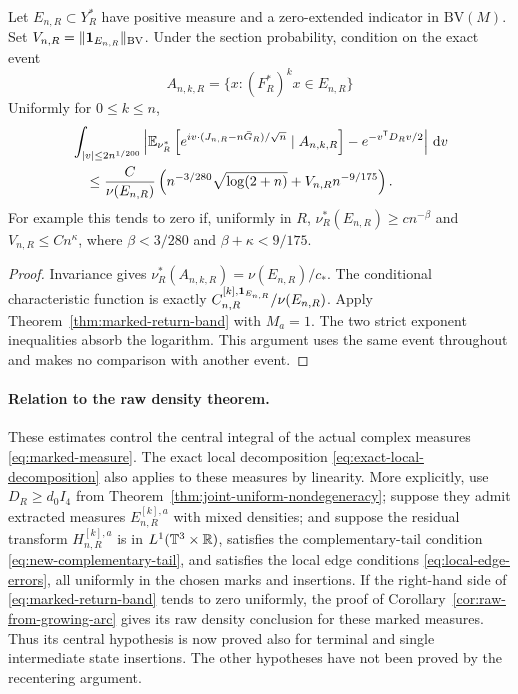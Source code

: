 \begin{corollary}
\label{cor:marked-state-conditioning}
Let $E_{n,R}\subset Y_R^*$ have positive measure and a zero-extended
indicator in $\mathrm{BV}(M)$. Set
$V_{n,R}=\|\mathbf1_{E_{n,R}}\|_{\mathrm{BV}}$. Under the section probability,
condition on the exact event
\[
 A_{n,k,R}=\{x:(F_R^*)^kx\in E_{n,R}\}
\]
Uniformly for $0\le k\le n$,
\begin{align}
 &\int_{|v|\le2n^{1/200}}
 \left|\mathbb E_{\nu_R^*}\left[
 e^{iv\cdot(J_{n,R}-n\bar G_R)/\sqrt n}\mid A_{n,k,R}\right]
          -e^{-v^{\mathsf T}D_Rv/2}\right|\,\mathrm d v\notag\\
 &\quad\le\frac{C}{\nu(E_{n,R})}
  \left(n^{-3/280}\sqrt{\log(2+n)}+V_{n,R}n^{-9/175}\right).
       \label{eq:marked-conditional-band}
\end{align}
For example this tends to zero if, uniformly in $R$,
$\nu_R^*(E_{n,R})\ge c n^{-\beta}$ and $V_{n,R}\le Cn^\kappa$,
where $\beta<3/280$ and $\beta+\kappa<9/175$.
\end{corollary}
\begin{proof}
Invariance gives $\nu_R^*(A_{n,k,R})=\nu(E_{n,R})/c_*$.
The conditional characteristic function is exactly
$C^{[k],\mathbf1_{E_{n,R}}}_{n,R}/\nu(E_{n,R})$. Apply
Theorem~\ref{thm:marked-return-band} with $M_a=1$. The two strict
exponent inequalities absorb the logarithm. This argument uses the
same event throughout and makes no comparison with another event.
\end{proof}

\paragraph{Relation to the raw density theorem.}
These estimates control the central integral of the actual complex
measures \eqref{eq:marked-measure}. The exact local decomposition
\eqref{eq:exact-local-decomposition} also applies to these measures by
linearity. More explicitly, use $D_R\ge d_0 I_4$ from
Theorem~\ref{thm:joint-uniform-nondegeneracy}; suppose they admit
extracted measures $E^{[k],a}_{n,R}$ with mixed densities; and suppose
the residual transform $H^{[k],a}_{n,R}$ is in
$L^1(\mathbb T^3\times\mathbb R)$, satisfies the complementary-tail condition
\eqref{eq:new-complementary-tail}, and satisfies the local edge
conditions \eqref{eq:local-edge-errors}, all uniformly in the chosen
marks and insertions. If the right-hand side of
\eqref{eq:marked-return-band} tends to zero uniformly, the proof of
Corollary~\ref{cor:raw-from-growing-arc} gives its raw density conclusion
for these marked measures. Thus its central hypothesis is now proved
also for terminal and single intermediate state insertions. The other
hypotheses have not been proved by the recentering argument.

